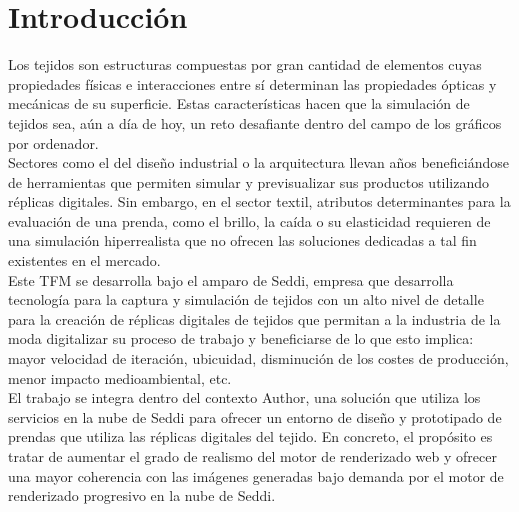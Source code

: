 \chapter{Introducci\'on}
Los tejidos son estructuras compuestas por gran cantidad de elementos cuyas propiedades f\'isicas e interacciones entre s\'i
determinan las propiedades \'opticas y mec\'anicas de su superficie. Estas caracter\'isticas hacen que la simulaci\'on de tejidos
sea, a\'un a d\'ia de hoy, un reto desafiante dentro del campo de los gr\'aficos por ordenador.\\

Sectores como el del dise\~no industrial o la arquitectura llevan a\~nos benefici\'andose de herramientas que permiten
simular y previsualizar sus productos utilizando r\'eplicas digitales. Sin embargo, en el sector textil, atributos determinantes
para la evaluaci\'on de una prenda, como el brillo, la ca\'ida o su elasticidad requieren de una simulaci\'on hiperrealista
que no ofrecen las soluciones dedicadas a tal fin existentes en el mercado.\\

Este TFM se desarrolla bajo el amparo de Seddi, empresa que desarrolla tecnolog\'ia para la captura y simulaci\'on de tejidos
con un alto nivel de detalle para la creaci\'on de r\'eplicas digitales de tejidos que permitan a la industria de la moda
digitalizar su proceso de trabajo y beneficiarse de lo que esto implica: mayor velocidad de iteraci\'on, ubicuidad, disminuci\'on de
los costes de producci\'on, menor impacto medioambiental, etc.\\

El trabajo se integra dentro del contexto Author, una soluci\'on que utiliza los servicios en la nube de Seddi para ofrecer
un entorno de dise\~no y prototipado de prendas que utiliza las r\'eplicas digitales del tejido. En concreto, el prop\'osito
es tratar de aumentar el grado de realismo del motor de renderizado web y ofrecer una mayor coherencia
con las im\'agenes generadas bajo demanda por el motor de renderizado progresivo en la nube de Seddi.








